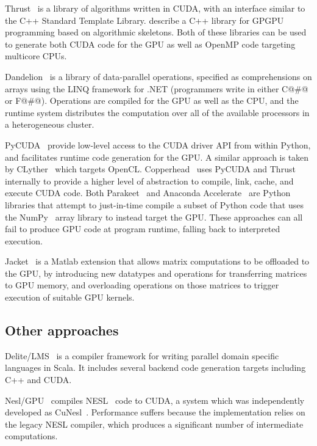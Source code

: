 Thrust~\cite{ThrustAParallelT:ub} is a library of algorithms written in CUDA,
with an interface similar to the C++ Standard Template Library.
\citet{Sato:2009cq} describe a C++ library for GPGPU programming based on
algorithmic skeletons. Both of these libraries can be used to generate both CUDA
code for the GPU as well as OpenMP code targeting multicore CPUs.



Dandelion~\cite{Rossbach:2013bj} is a library of data-parallel operations,
specified as comprehensions on arrays using the LINQ framework for .NET
(programmers write in either C@#@ or F@#@). Operations are compiled for the GPU
as well as the CPU, and the runtime system distributes the computation over all
of the available processors in a heterogeneous cluster.

PyCUDA~\cite{Klockner:2012tj} provide low-level access to the CUDA driver API
from within Python, and facilitates runtime code generation for the GPU\@. A
similar approach is taken by CLyther~\cite{CLyther:EvXSiruK} which targets
OpenCL. Copperhead~\cite{Catanzaro:2011cn} uses PyCUDA and Thrust internally to
provide a higher level of abstraction to compile, link, cache, and execute CUDA
code. Both Parakeet~\cite{Rubinsteyn:2012ve} and Anaconda
Accelerate~\cite{AnacondaAccelerate:2013vn} are Python libraries that attempt to
just-in-time compile a subset of Python code that uses the
NumPy~\cite{NumPy:2006uq} array library to instead target the GPU\@. These
approaches can all fail to produce GPU code at program runtime, falling back to
interpreted execution.

Jacket~\cite{AccelerEyes:vq} is a Matlab extension that allows matrix
computations to be offloaded to the GPU, by introducing new datatypes and
operations for transferring matrices to GPU memory, and overloading operations
on those matrices to trigger execution of suitable GPU kernels.


\subsection{Other approaches}

Delite/LMS~\cite{Rompf:2013er} is a compiler framework for writing parallel domain
specific languages in Scala. It includes several backend code generation targets
including C++ and CUDA\@.

Nesl/GPU~\cite{Bergstrom:2012bi} compiles NESL~\cite{Blelloch:1995ut} code to
CUDA, a system which was independently developed as CuNesl~\cite{Zhang:2012jl}.
Performance suffers because the implementation relies on the legacy NESL
compiler, which produces a significant number of intermediate computations.

